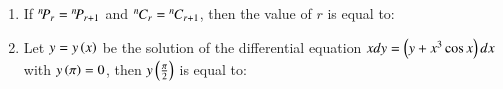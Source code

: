 \documentclass[journal,12pt,onecolumn]{IEEEtran}
\theoremstyle{remark}
\begin{document}
\begin{enumerate}
\hfill{}
\begin{enumerate}
\end{enumerate}

\item If ${{}^{n}\mkern-3muP_{r}}={{}^{n}\mkern-3muP_{r+1}}$ and ${{}^{n}\mkern-1muC_{r}} = {{}^{n}\mkern-1muC_{r+1}}$, then the value of $r$ is equal to:
\hfill{}
\begin{enumerate}
\end{enumerate}

\item Let $y=y\left(x\right)$ be the solution of the differential equation $xdy=\left(y+x^{3}\cos x\right)dx$ with $y\left(\pi\right)=0$, then $y\left(\frac{\pi}{2}\right)$ is equal to:

\hfill{}
\begin{enumerate}
\end{enumerate}
\end{enumerate}
\end{document}
